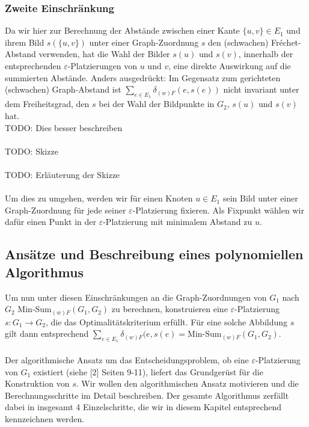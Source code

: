 \documentclass[a4paper, 12pt, twoside]{article}
\theoremstyle{Format1} %
\begin{document}
\subsubsection{Zweite Einschränkung} \label {Zweite Einschränkung}
Da wir hier zur Berechnung der Abstände zwischen einer Kante $\{u,v\} \in E_1$ und ihrem Bild $s(\{u,v\})$ unter einer Graph-Zuordnung $s$ den (schwachen) Fréchet-Abstand verwenden,
hat die Wahl der Bilder $s(u)$ und $s(v)$, innerhalb der entsprechenden $\varepsilon$-Platzierungen von $u$ und $v$, eine direkte Auswirkung auf die summierten Abstände.
Anders ausgedrückt: Im Gegensatz zum gerichteten (schwachen) Graph-Abstand ist $\sum_{e \in E_1}\delta_{(w)F}(e, s(e))$ nicht invariant unter dem Freiheitsgrad, den $s$
bei der Wahl der Bildpunkte in $G_2$, $s(u)$ und $s(v)$ hat.
\\
TODO: Dies besser beschreiben
\\
\\
TODO: Skizze
\\
\\
TODO: Erläuterung der Skizze
\\
\\
Um dies zu umgehen, werden wir für einen Knoten $u \in E_1$ sein Bild unter einer Graph-Zuordnung für jede seiner $\varepsilon$-Platzierung fixieren.
Als Fixpunkt wählen wir dafür einen Punkt in der $\varepsilon$-Platzierung mit minimalem Abstand zu $u$.

\subsection{Ansätze und Beschreibung eines polynomiellen Algorithmus} \label{Grundidee des Algorithmus}
Um nun unter diesen Einschränkungen an die Graph-Zuordnungen von $G_1$ nach $G_2$ Min-Sum$_{(w)F}(G_1,G_2)$ zu berechnen, konstruieren
eine $\varepsilon$-Platzierung $s: G_1 \to G_2$, die das Optimalitätskriterium erfüllt.
Für eine solche Abbildung $s$ gilt dann entsprechend $\sum_{e \in E_1}\delta_{(w)F}(e, s(e) = \text{Min-Sum}_{(w)F}(G_1,G_2)$.
\\
\\
Der algorithmische Ansatz um das Entscheidungsproblem, ob eine $\varepsilon$-Platzierung von $G_1$ existiert (siehe [2] Seiten 9-11), liefert das
Grundgerüst für die Konstruktion von $s$. Wir wollen den algorithmischen Ansatz motivieren und die Berechnungsschritte im Detail beschreiben.
Der gesamte Algorithmus zerfällt dabei in insgesamt 4 Einzelschritte, die wir in diesem Kapitel entsprechend kennzeichnen werden.
\end{document}
